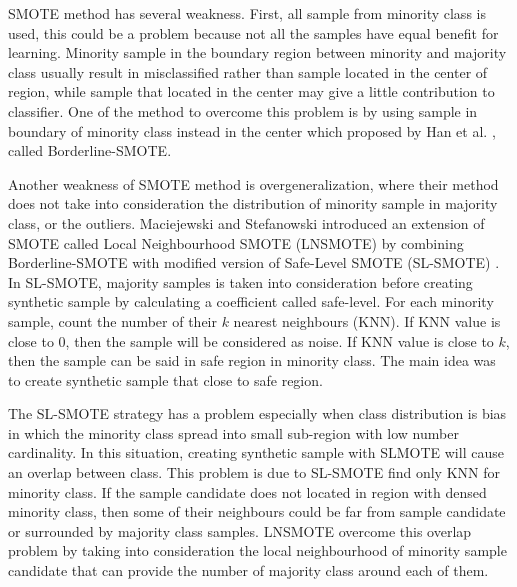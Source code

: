 SMOTE method has several weakness.
First, all sample from minority class is used, this could be a problem because
not all the samples have equal benefit for learning.
Minority sample in the boundary region between minority and majority class
usually result in misclassified rather than sample located in the center of
region, while sample that located in the center may give a little contribution
to classifier.
One of the method to overcome this problem is by using sample in boundary of
minority class instead in the center which proposed by Han et al.
\cite{han2005borderline}, called Borderline-SMOTE.

Another weakness of SMOTE method is overgeneralization, where their method does
not take into consideration the distribution of minority sample in majority
class, or the outliers.
Maciejewski and Stefanowski \cite{maciejewski2011local}
introduced an extension of SMOTE called Local Neighbourhood
SMOTE (LNSMOTE) \cite{maciejewski2011local} by combining Borderline-SMOTE
with modified version of Safe-Level SMOTE (SL-SMOTE)
\cite{bunkhumpornpat2009safe}.
In SL-SMOTE, majority samples is taken into consideration before creating
synthetic sample by calculating a coefficient called safe-level.
For each minority sample, count the number of their $k$ nearest neighbours (KNN).
If KNN value is close to 0, then the sample will be considered as noise.
If KNN value is close to $k$, then the sample can be said in safe region in
minority class.
The main idea was to create synthetic sample that close to safe region.

The SL-SMOTE strategy has a problem especially when class distribution is bias
in which the minority class spread into small sub-region with low number
cardinality.
In this situation, creating synthetic sample with SLMOTE will cause an overlap
between class.
This problem is due to SL-SMOTE find only KNN for minority class.
If the sample candidate does not located in region with densed minority class,
then some of their neighbours could be far from sample candidate or surrounded
by majority class samples.
LNSMOTE overcome this overlap problem by taking into consideration the local
neighbourhood of minority sample candidate that can provide the number of
majority class around each of them.

